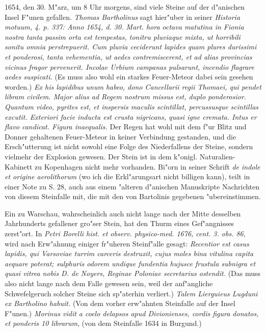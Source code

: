 \documentclass[a4paper, 11pt, oneside, polutonikogreek, german]{article}
\begin{document}
1654, den 30. M"arz, um 8 Uhr morgens, sind viele Steine auf der d"anischen Insel F"unen gefallen. \emph{Thomas Bartholinus} sagt hier"uber in seiner \emph{Historia motuum, 4. p. 337: Anno 1654, d. 30. Mart. hora octava matutina in Fionia nostra tanta passim orta est tempestas, tonitru pluviaque mixta, ut horribili sonitu omnia perstrepuerit. Cum pluvia ceciderunt lapides quam plures durissimi et ponderosi, tanta vehementia, ut aedes contremiscerent, et ad alias provincias vicinus fragor pervenerit. Incolae Urbium campanas pulsarunt, incendio flagrare aedes suspicati.} (Es muss also wohl ein starkes Feuer-Meteor dabei sein gesehen worden.) \emph{Ex his lapidibus unum habeo, dono Cancellarii regii Thomaei, qui pendet libram civilem. Major alius ad Regem nostrum missus est, duplo ponderosior. Quantum video, pyrites est, et inspersis maculis scintillat, percussusque scintillas excutit. Exteriori facie inducta est crusta nigricans, quasi igne cremata. Intus er flavo candicat. Figura inaequalis.} Der Regen hat wohl mit dem f"ur Blitz und Donner gehaltenen Feuer-Meteor in keiner Verbindung gestanden, und die Ersch"utterung ist nicht sowohl eine Folge des Niederfallens der Steine, sondern vielmehr der Explosion gewesen. Der Stein ist in dem k"onigl. Naturalien-Kabinett zu Kopenhagen nicht mehr vorhanden. Bi"orn in seiner Schrift \emph{de indole et origine aerolithorum} (wo ich die Erkl"arungsart nicht billigen kann), teilt in einer Note zu S. 28, auch aus einem "alteren d"anischen Manuskripte Nachrichten von diesem Steinfalle mit, die mit den von Bartolinis gegebenen "ubereinstimmen.

Ein zu Warschau, wahrscheinlich auch nicht lange nach der Mitte desselben Jahrhunderts gefallener gro"ser Stein, hat den Thurm eines Gef"angnisses zerst"ort. In \emph{Petri Borelli hist. et observ. physico-med. 1676, cent. 3. obs. 86}, wird nach Erw"ahnung einiger fr"uheren Steinf"alle gesagt: \emph{Recentior est casus lapidis, qui Varsoviae turrim carceris destruxit, cujus moles bina vitulina capita aequare poterat; sulphuris odorem undique fundentia hujusce frustula subnigra et quasi vitrea nobis D. de Noyers, Reginae Poloniae secretarius ostendit.} (Das muss also nicht lange nach dem Falle gewesen sein, weil der anf"angliche Schwefelgeruch solcher Steine sich sp"aterhin verliert.) \emph{Talem Lierguieus Lugduni ex Bartholino habuit.} (Von dem vorher erw"ahnten Steinfalle auf der Insel F"unen.) \emph{Morinus vidit a coelo delapsos apud Divionienses, cordis figura donatos, et ponderis 10 librarum}, (von dem Steinfalle 1634 in Burgund.)
\end{document}
